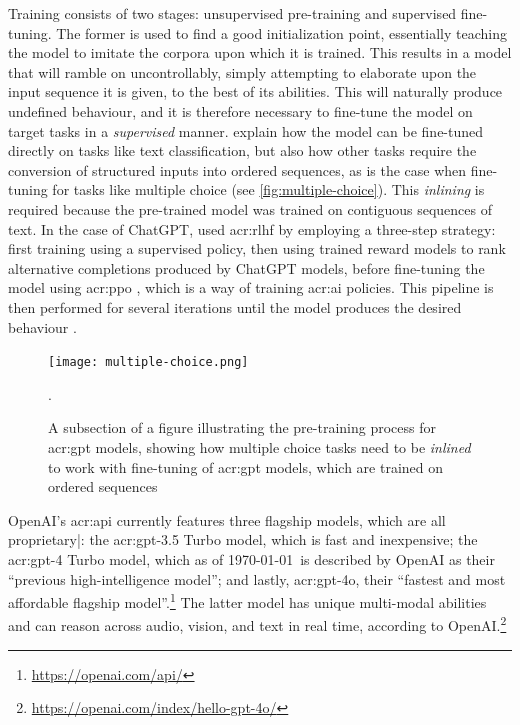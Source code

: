 Training consists of two stages: unsupervised pre-training and supervised fine-tuning. The former is used to find a good initialization point, essentially teaching the model to imitate the corpora upon which it is trained. This results in a model that will ramble on uncontrollably, simply attempting to elaborate upon the input sequence it is given, to the best of its abilities. This will naturally produce undefined behaviour, and it is therefore necessary to fine-tune the model on target tasks in a \textit{supervised} manner. \cite[4]{radfordImprovingLanguageUnderstanding2018} explain how the model can be fine-tuned directly on tasks like text classification, but also how other tasks require the conversion of structured inputs into ordered sequences, as is the case when fine-tuning for tasks like multiple choice (see \autoref{fig:multiple-choice}). This \textit{inlining} is required because the pre-trained model was trained on contiguous sequences of text. In the case of ChatGPT, \citeauthor{openaiIntroducingChatGPT2022} used \gls{acr:rlhf} \citep{christianoDeepReinforcementLearning2023} by employing a three-step strategy: first training using a supervised policy, then using trained reward models to rank alternative completions produced by ChatGPT models, before fine-tuning the model using \gls{acr:ppo} \citep{schulmanProximalPolicyOptimization2017}, which is a way of training \acrshort{acr:ai} policies. This pipeline is then performed for several iterations until the model produces the desired behaviour \citep{openaiIntroducingChatGPT2022}.

\begin{figure}
    \centering
    \texttt{[image: multiple-choice.png]}
    \caption[Inlining of a multiple choice task for GPT fine-tuning]{A subsection of a figure illustrating the pre-training process for \acrshort{acr:gpt} models, showing how multiple choice tasks need to be \textit{inlined} to work with fine-tuning of \acrshort{acr:gpt} models, which are trained on ordered sequences \citep[4]{radfordImprovingLanguageUnderstanding2018}}.
    \label{fig:multiple-choice}
\end{figure}

OpenAI's \acrshort{acr:api} currently features three flagship models, which are all proprietary|: the \acrshort{acr:gpt}-3.5 Turbo model, which is fast and inexpensive; the \acrshort{acr:gpt}-4 Turbo model, which as of \today~is described by OpenAI as their \enquote{previous high-intelligence model}; and lastly, \acrshort{acr:gpt}-4o, their \enquote{fastest and most affordable flagship model}.\footnote{\url{https://openai.com/api/}} The latter model has unique multi-modal abilities and can reason across audio, vision, and text in real time, according to OpenAI.\footnote{\url{https://openai.com/index/hello-gpt-4o/}}

